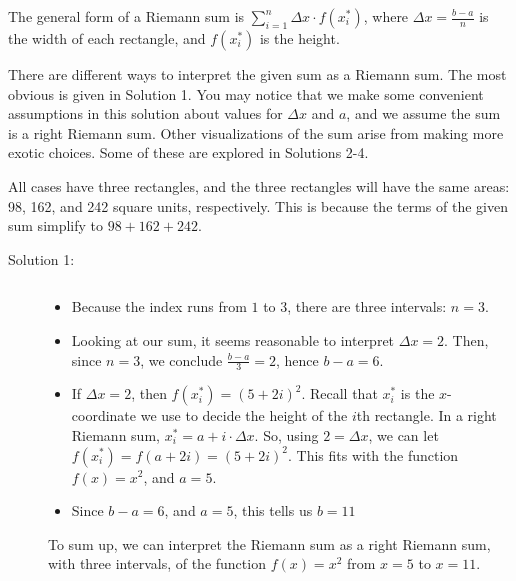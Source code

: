 \begin{solution}
The general form of a Riemann sum is $\displaystyle\sum_{i=1}^n \Delta x \cdot f(x_i^*)$, where $\Delta x = \frac{b-a}{n}$ is the width of each rectangle, and $f(x_i^*)$ is the height.

There are different ways to interpret the given sum as a Riemann sum. The most obvious is given in Solution 1. You may notice that we make some convenient assumptions in this solution about values for $\Delta x$ and $a$, and we assume the sum is a right Riemann sum. Other visualizations of the sum arise from making more exotic choices. Some of these are explored in Solutions 2-4.

All cases have three rectangles, and the three rectangles will have the same areas: 98, 162, and 242 square units, respectively. This is because the terms of the given sum simplify to $98+162+242$.

\begin{description}
\item[Solution 1:]$ $
\begin{itemize}
\item Because the index runs from $1$ to $3$, there are three intervals: $n=3$.

\item Looking at our sum, it seems reasonable to interpret $\Delta x = 2$. Then, since $n=3$, we conclude $\frac{b-a}{3}=2$, hence $b-a=6$.

\item If $\Delta x = 2$, then $f(x_i^*)=\left(5+2i\right)^2$. Recall that $x_i^*$ is the $x$-coordinate we use to decide the height of the $i$th rectangle. In a right Riemann sum, $x_i^* = a+i\cdot\Delta x$. So, using $2=\Delta x$, we can let $f(x_i^*)=f(a+2i)=\left(5+2i\right)^2$. This fits with the function $f(x)=x^2$, and $a=5$.
\item Since $b-a=6$, and $a=5$, this tells us $b=11$
\end{itemize}

To sum up, we can interpret the Riemann sum as a right Riemann sum, with three intervals, of the function $f(x)=x^2$ from $x=5$ to $x=11$.


\begin{center}
\end{center}


\end{description}
\end{solution}
